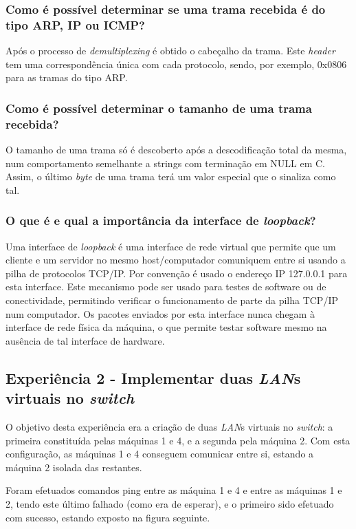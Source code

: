\documentclass[a4paper, 11pt]{article}
\begin{document}
\subsubsection{Como é possível determinar se uma trama recebida é do tipo ARP, IP ou ICMP?}
Após o processo de \textit{demultiplexing} é obtido o cabeçalho da trama. Este \textit{header} tem uma correspondência única com cada protocolo, sendo, por exemplo, 0x0806 para as tramas do tipo ARP.

\subsubsection{Como é possível determinar o tamanho de uma trama recebida?}
O tamanho de uma trama só é descoberto após a descodificação total da mesma, num comportamento semelhante a strings com terminação em NULL em C. Assim, o último \textit{byte} de uma trama terá um valor especial que o sinaliza como tal.

\subsubsection{O que é e qual a importância da interface de \textit{loopback}?}
Uma interface de \textit{loopback} é uma interface de rede virtual que permite que um cliente e um servidor no mesmo host/computador comuniquem entre si usando a pilha de protocolos TCP/IP. Por convenção é usado o endereço IP 127.0.0.1 para esta interface.
Este mecanismo pode ser usado para testes de software ou de conectividade, permitindo verificar o funcionamento de parte da pilha TCP/IP num computador. Os pacotes enviados por esta interface nunca chegam à interface de rede física da máquina, o que permite testar software mesmo na ausência de tal interface de hardware.

\subsection{Experiência 2 - Implementar duas \textit{LAN}s virtuais no \textit{switch}}
O objetivo desta experiência era a criação de duas \textit{LAN}s virtuais no \textit{switch}: a primeira constituída pelas máquinas 1 e 4, e a segunda pela máquina 2. Com esta configuração, as máquinas 1 e 4 conseguem comunicar entre si, estando a máquina 2 isolada das restantes.

Foram efetuados comandos ping entre as máquina 1 e 4 e entre as máquinas 1 e 2, tendo este último falhado (como era de esperar), e o primeiro sido efetuado com sucesso, estando exposto na figura seguinte.
\end{document}
